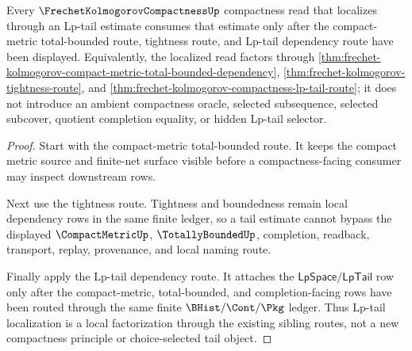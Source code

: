 \begin{theorem}
\label{thm:frechet-kolmogorov-compactness-lp-tail-localization}
Every $\FrechetKolmogorovCompactnessUp$ compactness read that localizes through an Lp-tail estimate consumes that estimate only after the compact-metric total-bounded route, tightness route, and Lp-tail dependency route have been displayed. Equivalently, the localized read factors through \autoref{thm:frechet-kolmogorov-compact-metric-total-bounded-dependency}, \autoref{thm:frechet-kolmogorov-tightness-route}, and \autoref{thm:frechet-kolmogorov-compactness-lp-tail-route}; it does not introduce an ambient compactness oracle, selected subsequence, selected subcover, quotient completion equality, or hidden Lp-tail selector.
\end{theorem}
\begin{proof}
Start with the compact-metric total-bounded route. It keeps the compact metric source and finite-net surface visible before a compactness-facing consumer may inspect downstream rows.

Next use the tightness route. Tightness and boundedness remain local dependency rows in the same finite ledger, so a tail estimate cannot bypass the displayed $\CompactMetricUp$, $\TotallyBoundedUp$, completion, readback, transport, replay, provenance, and local naming route.

Finally apply the Lp-tail dependency route. It attaches the $\mathsf{LpSpace}/\mathsf{LpTail}$ row only after the compact-metric, total-bounded, and completion-facing rows have been routed through the same finite $\BHist/\Cont/\Pkg$ ledger. Thus Lp-tail localization is a local factorization through the existing sibling routes, not a new compactness principle or choice-selected tail object.
\end{proof}
